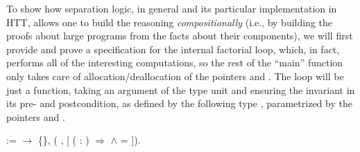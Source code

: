 To show how separation logic, in general and its particular
implementation in HTT, allows one to build the reasoning
\textit{compositionally} (i.e., by building the proofs about large programs
from the facts about their components), we will first provide and
prove a specification for the internal factorial loop, which, in fact,
performs all of the interesting computations, so the rest of the
``main'' function only takes care of allocation/deallocation of the
pointers  and . The loop will be just a function, taking an
argument of the type unit and ensuring the invariant  in its
pre- and postcondition, as defined by the following type ,
parametrized by the pointers  and .
\begin{coqdoccode}
\coqdocemptyline
\coqdocnoindent
{}    := \coqdoceol
\coqdocindent{1.00em}
 \ensuremath{\rightarrow} \{\}, \coqdoceol
\coqdocindent{2.50em}
 (   , \coqdoceol
\coqdocindent{5.50em}
[ ( : )  \ensuremath{\Rightarrow}      \ensuremath{\land}  =  ]).\coqdoceol
\coqdocemptyline
\end{coqdoccode}


